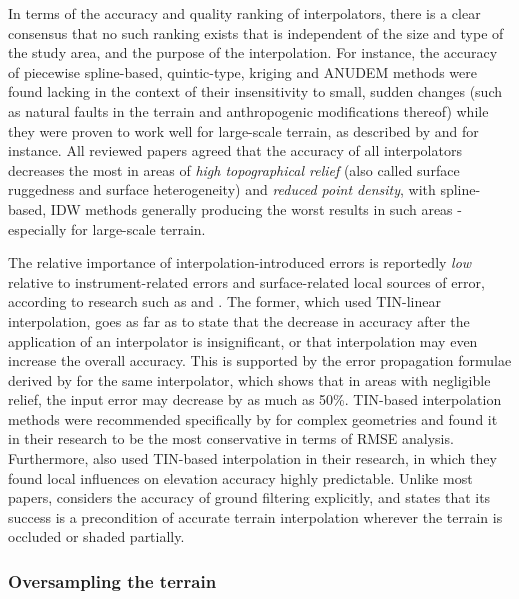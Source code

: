 In terms of the accuracy and quality ranking of interpolators, there is a clear consensus that no such ranking exists that is independent of the size and type of the study area, and the purpose of the interpolation. For instance, the accuracy of piecewise spline-based, quintic-type, kriging and ANUDEM methods were found lacking in the context of their insensitivity to small, sudden changes (such as natural faults in the terrain and anthropogenic modifications thereof) while they were proven to work well for large-scale terrain, as described by \cite{bater_coops_2009} and \cite{guo_etal_2010} for instance. All reviewed papers agreed that the accuracy of all interpolators decreases the most in areas of \textit{high topographical relief} (also called surface ruggedness and surface heterogeneity) and \textit{reduced point density}, with spline-based, IDW methods generally producing the worst results in such areas - especially for large-scale terrain.

The relative importance of interpolation-introduced errors is reportedly \textit{low} relative to instrument-related errors and surface-related local sources of error, according to research such as \cite{hodgson_breshanan_2004} and \cite{aguilar_etal_2010}. The former, which used TIN-linear interpolation, goes as far as to state that the decrease in accuracy after the application of an interpolator is insignificant, or that interpolation may even increase the overall accuracy. This is supported by the error propagation formulae derived by \cite{fan_etal_2014} for the same interpolator, which shows that in areas with negligible relief, the input error may decrease by as much as 50\%. TIN-based interpolation methods were recommended specifically by \cite{bater_coops_2009} for complex geometries and found it in their research to be the most conservative in terms of RMSE analysis. Furthermore, \cite{peng_shih_2006} also used TIN-based interpolation in their research, in which they found local influences on elevation accuracy highly predictable. Unlike most papers, \cite{aguilar_etal_2010} considers the accuracy of ground filtering explicitly, and states that its success is a precondition of accurate terrain interpolation wherever the terrain is occluded or shaded partially.

\subsubsection{Oversampling the terrain}

